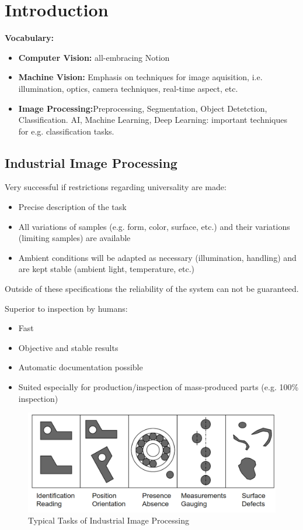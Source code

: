 \section{Introduction}
\textbf{Vocabulary:}
\begin{itemize}
    \item \textbf{Computer Vision:} all-embracing Notion
    \item \textbf{Machine Vision:} Emphasis on techniques for image aquisition, i.e. illumination, optics, camera techniques, real-time aspect, etc.
    \item \textbf{Image Processing:}Preprocessing, Segmentation, Object Detetction, Classification. AI, Machine Learning, Deep Learning: important techniques for e.g. classification tasks.
\end{itemize}

\subsection{Industrial Image Processing}
Very successful if restrictions regarding universality are made:
\begin{itemize}
    \item Precise description of the task
    \item All variations of samples (e.g. form, color, surface, etc.) and their variations (limiting samples) are available
    \item Ambient conditions will be adapted as necessary (illumination, handling) and are kept stable (ambient light, temperature, etc.)
\end{itemize}
Outside of these specifications the reliability of the system can not be guaranteed.

Superior to inspection by humans:
\begin{itemize}
    \item Fast
    \item Objective and stable results
    \item Automatic documentation possible
    \item Suited especially for production/inspection of mass-produced parts (e.g. 100\% inspection)
\end{itemize}
\begin{figure}[ht]
    \centering
    \includegraphics[width=0.8\columnwidth]{Images/01/IndustrialTasks.png}
    \caption{Typical Tasks of Industrial Image Processing}
    \label{fig:01_Introduction}
\end{figure}
